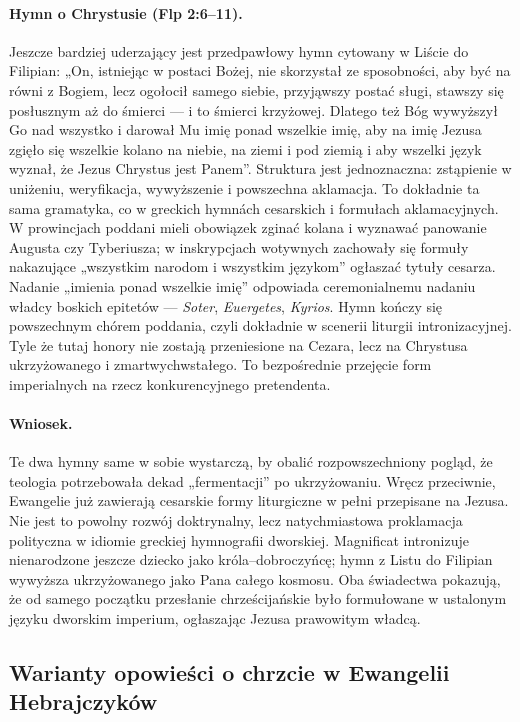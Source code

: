 \paragraph{Hymn o Chrystusie (Flp 2:6--11).}
Jeszcze bardziej uderzający jest przedpawłowy hymn cytowany w Liście do Filipian:
„On, istniejąc w postaci Bożej,
nie skorzystał ze sposobności, aby być na równi z Bogiem,
lecz ogołocił samego siebie,
przyjąwszy postać sługi,
stawszy się posłusznym aż do śmierci — i to śmierci krzyżowej.
Dlatego też Bóg wywyższył Go nad wszystko
i darował Mu imię ponad wszelkie imię,
aby na imię Jezusa
zgięło się wszelkie kolano
na niebie, na ziemi i pod ziemią
i aby wszelki język wyznał,
że Jezus Chrystus jest Panem”.
Struktura jest jednoznaczna: zstąpienie w uniżeniu, weryfikacja, wywyższenie i powszechna aklamacja.
To dokładnie ta sama gramatyka, co w greckich hymnách cesarskich i formułach aklamacyjnych.
W prowincjach poddani mieli obowiązek zginać kolana i wyznawać panowanie Augusta czy Tyberiusza; w inskrypcjach wotywnych zachowały się formuły nakazujące „wszystkim narodom i wszystkim językom” ogłaszać tytuły cesarza.
Nadanie „imienia ponad wszelkie imię” odpowiada ceremonialnemu nadaniu władcy boskich epitetów — \emph{Soter}, \emph{Euergetes}, \emph{Kyrios}.
Hymn kończy się powszechnym chórem poddania, czyli dokładnie w scenerii liturgii intronizacyjnej.
Tyle że tutaj honory nie zostają przeniesione na Cezara, lecz na Chrystusa ukrzyżowanego i zmartwychwstałego.
To bezpośrednie przejęcie form imperialnych na rzecz konkurencyjnego pretendenta.

\paragraph{Wniosek.}
Te dwa hymny same w sobie wystarczą, by obalić rozpowszechniony pogląd, że teologia potrzebowała dekad „fermentacji” po ukrzyżowaniu.
Wręcz przeciwnie, Ewangelie już zawierają cesarskie formy liturgiczne w pełni przepisane na Jezusa.
Nie jest to powolny rozwój doktrynalny, lecz natychmiastowa proklamacja polityczna w idiomie greckiej hymnografii dworskiej.
Magnificat intronizuje nienarodzone jeszcze dziecko jako króla–dobroczyńcę; hymn z Listu do Filipian wywyższa ukrzyżowanego jako Pana całego kosmosu.
Oba świadectwa pokazują, że od samego początku przesłanie chrześcijańskie było formułowane w ustalonym języku dworskim imperium, ogłaszając Jezusa prawowitym władcą.

\subsection{Warianty opowieści o chrzcie w Ewangelii Hebrajczyków}\label{subsec:gospel-of-the-hebrews-variants-of-the-baptism-story}


